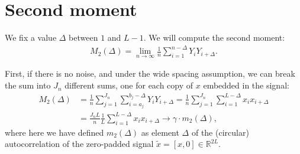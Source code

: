 \documentclass{article}
\theoremstyle{thm}
\theoremstyle{definition}
\begin{document}
\begin{comment}

Actually, what Tamir meant when he said first moment was the average of the windows' averages (a scalar), not the average window (a vector). But this also converges a.s.\ to $\gamma \cdot \bar{x}$, by simply exchanging limits and finite sums, as follows. The sample mean of the window starting at index $i$ is just $\frac{1}{L} \sum_{k=0}^{L-1} Y_{i+k}$. Averaging these over all $n$ windows and taking the limit as $n \to \infty$ we get:
%
\begin{align}
%
    \lim_{n\to\infty} \frac{1}{n} \sum_{i=1}^n \frac{1}{L} \sum_{k=0}^{L-1} Y_{i+k}
    =  \frac{1}{L} \sum_{k=0}^{L-1} \lim_{n\to\infty} \frac{1}{n} \sum_{i=1}^n Y_{i+k}
    = \gamma \cdot \bar{x}.
%
\end{align}

\end{comment}

%
%
%

\section{Second moment}

We fix a value $\Delta$ between $1$ and $L-1$. We will compute the second moment:
%
\begin{align}
%
    M_2(\Delta) = 
        \lim_{n \to \infty} \frac{1}{n} \sum_{i=1}^{n-\Delta} Y_i Y_{i+\Delta}.
%
\end{align}

First, if there is no noise, and under the wide spacing assumption, we can break the sum into $J_n$ different sums, one for each copy of $x$ embedded in the signal:
%
\begin{align}
%
    M_2(\Delta) 
        &= \frac{1}{n} \sum_{j=1}^{J_n} \sum_{i=a_j}^{b_j-\Delta} Y_i Y_{i+\Delta}
        = \frac{1}{n} \sum_{j=1}^{J_n} \sum_{i=1}^{L-\Delta} x_i x_{i+\Delta}
    \nonumber \\
    &= \frac{J_n L}{n} \frac{1}{L} \sum_{i=1}^{L-\Delta} x_i x_{i+\Delta}
        \to \gamma \cdot m_2(\Delta),
%
\end{align}
%
where here we have defined $m_2(\Delta)$ as element $\Delta$ of the (circular) autocorrelation of the zero-padded signal $\tilde{x} = [x,0] \in \mathbb{R}^{2L}$.
\end{document}
